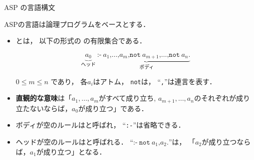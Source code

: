 \documentclass[dvipdfmx,10pt]{beamer}
\begin{document}
\begin{frame}{ASP の言語構文}
\begin{alertblock}{}\centering
  ASPの言語は論理プログラムをベースとする\footnotemark．
\end{alertblock}

\begin{itemize}
  \item {}とは，
	以下の形式の
	の有限集合である．
\begin{block}{}
    \[
	\underbrace{a_0}_{\textrm{ヘッド}}\ \texttt{:-}\
	\underbrace{a_1\texttt{,}\dots\texttt{,}a_m\texttt{,}
	\texttt{not}\ {a_{m+1}}\texttt{,}\dots\texttt{,}
	\texttt{not}\ {a_n}\texttt{.}}_{\textrm{ボディ}}
    \]
\end{block}
    $0\leq m\leq n$ であり，
    各$a_i$はアトム，
    \texttt{not}は，
    ``\texttt{,}''は連言を表す．
    \pause
  \item \alert{\bf 直観的な意味}は「$a_1,\ldots,a_m$がすべて成り立ち,
    $a_{m+1},\ldots,a_n$のそれぞれが成り立たないならば，$a_0$が成り立つ」である．
    \pause
  \item ボディが空のルールはと呼ばれ，
	``\texttt{:-}''は省略できる．
  \item ヘッドが空のルールはと呼ばれる．
	``\(\texttt{:-}\ \texttt{not}\ a_1\texttt{,} {a_{2}}\texttt{.}\)''は，
	「$a_2$が成り立つならば，$a_1$が成り立つ」となる．
\end{itemize}
\end{frame}
\end{document}
